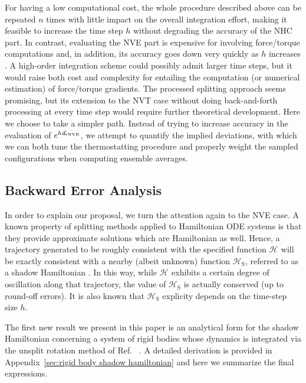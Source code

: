 \documentclass[
journal=jctcce,
layout=twocolumn
]{achemso}
\newcommand{\Ham}[1]{{\mathcal H}_\text{#1}}    %
\newcommand{\Liu}[1]{i\!L_\text{#1}}            %
\newcommand{\timestep}{h}
\begin{document}
For having a low computational cost, the whole procedure described above can be repeated $n$ times with little impact on the overall integration effort, making it feasible to increase the time step $\timestep$ without degrading the accuracy of the NHC part.
In contrast, evaluating the NVE part is expensive for involving force/torque computations and, in addition, its accuracy goes down very quickly as $\timestep$ increases \cite{Davidchack_2010, Silveira_2017}.
A high-order integration scheme\cite{Omelyan_2007, Van_zon_2008} could possibly admit larger time steps, but it would raise both cost and complexity for entailing the computation (or numerical estimation) of force/torque gradients.
The processed splitting approach \cite{Omelyan_2008} seems promising, but its extension to the NVT case without doing back-and-forth processing at every time step would require further theoretical development.
Here we choose to take a simpler path.
Instead of trying to increase accuracy in the evaluation of $e^{\timestep \Liu{\tiny NVE}}$, we attempt to quantify the implied deviations, with which we can both tune the thermostatting procedure and properly weight the sampled configurations when computing ensemble averages.

\subsection{Backward Error Analysis}
\label{sec:modified_h}

In order to explain our proposal, we turn the attention again to the NVE case.
A known property of splitting methods applied to Hamiltonian ODE systems is that they provide approximate solutions which are Hamiltonian as well.
Hence, a trajectory generated to be roughly consistent with the specified function $\Ham{}$ will be exactly consistent with a nearby (albeit unknown) function $\Ham{S}$, referred to as a shadow Hamiltonian \cite{Hairer_2006}.
In this way, while $\Ham{}$ exhibits a certain degree of oscillation along that trajectory, the value of $\Ham{S}$ is actually conserved (up to round-off errors). 
It is also known that $\Ham{S}$ explicity depends on the time-step size $\timestep$.

The first new result we present in this paper is an analytical form for the shadow Hamiltonian concerning a system of rigid bodies whose dynamics is integrated via the unsplit rotation method of Ref.~ .
A detailed derivation is provided in Appendix~\ref{sec:rigid body shadow hamiltonian} and here we summarize the final expressions.
\end{document}
